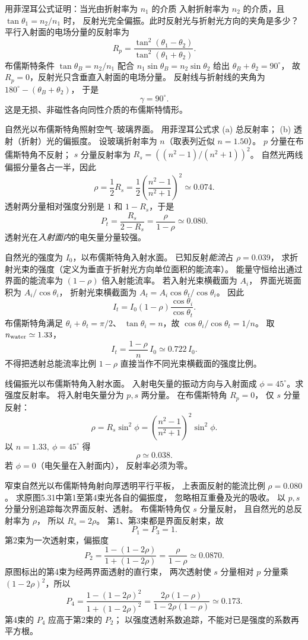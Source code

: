 用菲涅耳公式证明：当光由折射率为 $n_1$ 的介质
入射折射率为 $n_2$ 的介质，且
$\tan\theta_1=n_2/n_1$ 时，
反射光完全偏振。此时反射光与折射光方向的夹角是多少？
\exsolution
平行入射面的电场分量的反射率为
\[
 R_p=\frac{\tan^2(\theta_1-\theta_2)}
 {\tan^2(\theta_1+\theta_2)}.
\]
布儒斯特条件
$\tan\theta_B=n_2/n_1$ 配合
$n_1\sin\theta_B=n_2\sin\theta_2$
给出 $\theta_B+\theta_2=90^\circ$，
故 $R_p=0$，反射光只含垂直入射面的电场分量。
反射线与折射线的夹角为
$180^\circ-(\theta_B+\theta_2)$，
于是
\[
 \boxed{\gamma=90^\circ}.
\]
\excheck 这是无损、非磁性各向同性介质的布儒斯特情形。

自然光以布儒斯特角照射空气--玻璃界面。
用菲涅耳公式求 (a) 总反射率；
(b) 透射（折射）光的偏振度。
\exsolution
设玻璃折射率为 $n$（取表列近似 $n=1.50$）。
$p$ 分量在布儒斯特角不反射；
$s$ 分量反射率为
$R_s=((n^2-1)/(n^2+1))^2$。
自然光两线偏振分量各占一半，因此
\[
 \boxed{\rho=\frac12 R_s
 =\frac12\left(\frac{n^2-1}{n^2+1}\right)^2
 \simeq0.074}.
\]
透射两分量相对强度分别是
$1$ 和 $1-R_s$，于是
\[
 \boxed{P_t=\frac{R_s}{2-R_s}
 =\frac{\rho}{1-\rho}\simeq0.080}.
\]
\excheck 透射光在\emph{入射面内}的电矢量分量较强。

自然光的强度为 $I_0$，以布儒斯特角入射水面。
已知反射\emph{能流}占 $\rho=0.039$，
求折射光束的强度（定义为垂直于折射光方向单位面积的能流率）。
\exsolution
能量守恒给出通过界面的能流率为
$(1-\rho)$ 倍入射能流率。
若入射光束横截面为 $A_i$，
界面光斑面积为 $A_i/\cos\theta_i$，
折射光束横截面为
$A_t=A_i\cos\theta_t/\cos\theta_i$。
因此
\[
 I_t=I_0(1-\rho)\frac{\cos\theta_i}{\cos\theta_t}.
\]
布儒斯特角满足
$\theta_i+\theta_t=\pi/2$、
$\tan\theta_i=n$，故
$\cos\theta_i/\cos\theta_t=1/n$。
取 $n_{\rm water}\simeq1.33$，
\[
 \boxed{I_t=\frac{1-\rho}{n}\,I_0
 \simeq0.722\,I_0}.
\]
\excheck 不得把透射总能流率比例 $1-\rho$
直接当作不同光束横截面的强度比例。

线偏振光以布儒斯特角入射水面。
入射电矢量的振动方向与入射面成
$\phi=45^\circ$。求强度反射率。
\exsolution
将入射电矢量分为 $p,s$ 两分量。
在布儒斯特角 $R_p=0$，
仅 $s$ 分量反射：
\[
 \rho=R_s\sin^2\phi
 =\left(\frac{n^2-1}{n^2+1}\right)^2\sin^2\phi.
\]
以 $n=1.33,\ \phi=45^\circ$ 得
\[
 \boxed{\rho\simeq0.038}.
\]
\excheck 若 $\phi=0$（电矢量在入射面内），
反射率必须为零。

窄束自然光以布儒斯特角射向厚透明平行平板，
上表面反射的能流比例 $\rho=0.080$。
求原图5.31中第1至第4束光各自的偏振度，
忽略相互重叠及光的吸收。
\exsolution
以 $p,s$ 分量分别追踪每次界面反射、透射。
布儒斯特角仅 $s$ 分量反射，
且自然光的总反射率为 $\rho$，
所以 $R_s=2\rho$。
第1、第3束都是界面反射束，故
\[
 \boxed{P_1=P_3=1}.
\]
第2束为一次透射束，偏振度
\[
 \boxed{P_2=\frac{1-(1-2\rho)}{1+(1-2\rho)}
 =\frac{\rho}{1-\rho}\simeq0.0870}.
\]
原图标出的第4束为经两界面透射的直行束，
两次透射使 $s$ 分量相对 $p$ 分量乘
$(1-2\rho)^2$，所以
\[
 \boxed{P_4=\frac{1-(1-2\rho)^2}{1+(1-2\rho)^2}
 =\frac{2\rho(1-\rho)}{1-2\rho(1-\rho)}
 \simeq0.173}.
\]
\excheck 第4束的 $P_4$ 应高于第2束的 $P_2$；
以强度透射系数追踪，不能对已是强度的系数再平方根。


